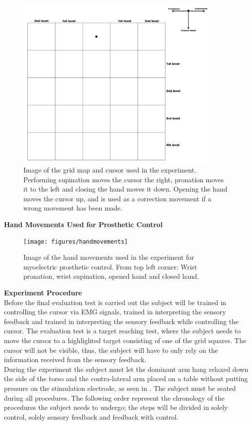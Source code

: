 \begin{figure}[H]                 
	\includegraphics[width=0.9\textwidth]{figures/gridmap2}  
	\caption{Image of the grid map and cursor used in the experiment. Performing supination moves the cursor the right, pronation moves it to the left and closing the hand moves it down. Opening the hand moves the cursor up, and is used as a correction movement if a wrong movement has been made.}
	\label{fig:gridmap} 
\end{figure}
\newpage

\textbf{{\Large Hand Movements Used for Prosthetic Control}} \\

\begin{figure}[H]                 
	\texttt{[image: figures/handmovements]}
	\caption{Image of the hand movements used in the experiment for myoelectric prosthetic control. From top left corner: Wrist pronation, wrist supination, opened hand and closed hand.}
	\label{fig:handmovements} 
\end{figure}

\textbf{{\Large Experiment Procedure}} \\
\newline
Before the final evaluation test is carried out the subject will be trained in controlling the cursor via EMG signals, trained in interpreting the sensory feedback and trained in interpreting the sensory feedback while controlling the cursor. The evaluation test is a target reaching test, where the subject needs to move the cursor to a highlighted target consisting of one of the grid squares. The cursor will not be visible, thus, the subject will have to only rely on the information received from the sensory feedback. \\
During the experiment the subject must let the dominant arm hang relaxed down the side of the torso and the contra-lateral arm placed on a table without putting pressure on the stimulation electrode, as seen in . The subject must be seated during all procedures. The following order represent the chronology of the procedures the subject needs to undergo; the steps will be divided in solely control, solely sensory feedback and feedback with control. 


